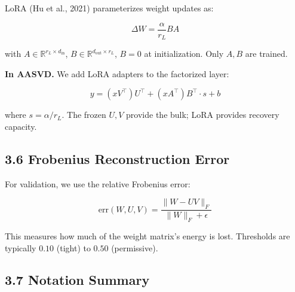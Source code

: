 LoRA (Hu et al., 2021) parameterizes weight updates as:

\[
\Delta W = \frac{\alpha}{r_L} B A
\tag{3.9}
\]

with $A \in \mathbb{R}^{r_L \times d_\text{in}}$, $B \in \mathbb{R}^{d_\text{out} \times r_L}$, 
$B = 0$ at initialization. Only $A, B$ are trained.

\textbf{In AASVD.} We add LoRA adapters to the factorized layer:

\[
y = (x V^\top) U^\top + (x A^\top) B^\top \cdot s + b
\tag{3.10}
\]

where $s = \alpha / r_L$. The frozen $U, V$ provide the bulk; LoRA provides 
recovery capacity.

\subsection{3.6 Frobenius Reconstruction Error}

For validation, we use the relative Frobenius error:

\[
\text{err}(W, U, V) = \frac{\|W - UV\|_F}{\|W\|_F + \epsilon}
\tag{3.11}
\]

This measures how much of the weight matrix's energy is lost. Thresholds 
are typically $0.10$ (tight) to $0.50$ (permissive).

\subsection{3.7 Notation Summary}
